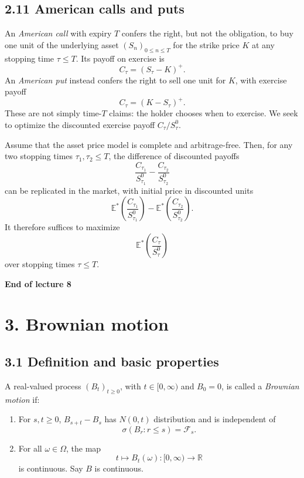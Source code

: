 \documentclass[11pt,a4paper]{article}
\begin{document}
\newpage
\subsection*{2.11 American calls and puts}

An \emph{American call} with expiry $T$ confers the right, but not
the obligation, to buy one unit of the underlying asset
$(S_n)_{0\leq n\leq T}$ for the strike price $K$ at any stopping
time $\tau\leq T$. Its payoff on exercise is
\[
C_\tau=(S_\tau-K)^+.
\]
An \emph{American put} instead confers the right to sell one unit
for $K$, with exercise payoff
\[
C_\tau=(K-S_\tau)^+.
\]
These are not simply time-$T$ claims: the holder chooses when to
exercise. We seek to optimize the discounted exercise payoff
$C_\tau/S_\tau^0$.

Assume that the asset price model is complete and arbitrage-free.
Then, for any two stopping times $\tau_1,\tau_2\leq T$, the
difference of discounted payoffs
\[
\frac{C_{\tau_1}}{S_{\tau_1}^0}
-\frac{C_{\tau_2}}{S_{\tau_2}^0}
\]
can be replicated in the market, with initial price in discounted
units
\[
\mathbb E^*\!\left(\frac{C_{\tau_1}}{S_{\tau_1}^0}\right)
-\mathbb E^*\!\left(\frac{C_{\tau_2}}{S_{\tau_2}^0}\right).
\]
It therefore suffices to maximize
\[
\mathbb E^*\!\left(\frac{C_\tau}{S_\tau^0}\right)
\]
over stopping times $\tau\leq T$.

\begin{center}
\textbf{End of lecture 8}
\end{center}

\newpage
\section*{3. Brownian motion}

\subsection*{3.1 Definition and basic properties}

A real-valued process $(B_t)_{t\geq0}$, with $t\in[0,\infty)$ and
$B_0=0$, is called a \emph{Brownian motion} if:
\begin{enumerate}
    \item[(a)] For $s,t\geq0$, $B_{s+t}-B_s$ has $N(0,t)$
    distribution and is independent of
    \[
    \sigma(B_r:r\leq s)=\mathcal F_s.
    \]

    \item[(b)] For all $\omega\in\Omega$, the map
    \[
    t\longmapsto B_t(\omega):[0,\infty)\longrightarrow\mathbb R
    \]
    is continuous. Say $B$ is continuous.
\end{enumerate}
\end{document}
